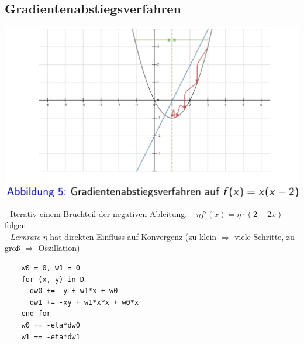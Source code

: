 \documentclass{report}
\begin{document}
  \subsection{Gradientenabstiegsverfahren}	
  
  \begin{center}	
    \includegraphics[scale=.25]{ml02_3}	
  \end{center}	
  - Iterativ einem Bruchteil der negativen Ableitung: $-\eta f'(x) = \eta\cdot (2 - 2x)$ folgen\\	
  - \textit{Lernrate} $\eta$ hat direkten Einfluss auf Konvergenz (zu klein $\Rightarrow$ viele Schritte, zu groß $\Rightarrow$ Oszillation)\\	
  \begin{lstlisting}	
    w0 = 0, w1 = 0	
    for (x, y) in D	
      dw0 += -y + w1*x + w0	
      dw1 += -xy + w1*x*x + w0*x	
    end for	
    w0 += -eta*dw0	
    w1 += -eta*dw1	
  \end{lstlisting}	
  
\end{document}
